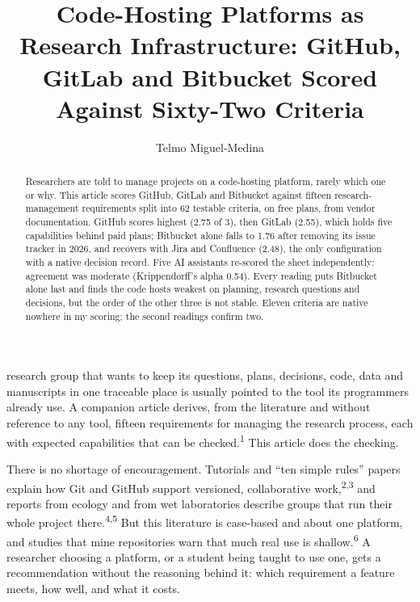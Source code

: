 \documentclass{IEEEcsmag}
\begin{document}

\title{Code-Hosting Platforms as Research Infrastructure: GitHub, GitLab and Bitbucket Scored Against Sixty-Two Criteria}

\author{Telmo Miguel-Medina}


\begin{abstract}
Researchers are told to manage projects on a code-hosting platform, rarely which one or why. This article scores GitHub, GitLab and Bitbucket against fifteen research-management requirements split into 62 testable criteria, on free plans, from vendor documentation. GitHub scores highest (2.75 of 3), then GitLab (2.55), which holds five capabilities behind paid plans; Bitbucket alone falls to 1.76 after removing its issue tracker in 2026, and recovers with Jira and Confluence (2.48), the only configuration with a native decision record. Five AI assistants re-scored the sheet independently: agreement was moderate (Krippendorff's alpha 0.54). Every reading puts Bitbucket alone last and finds the code hosts weakest on planning, research questions and decisions, but the order of the other three is not stable. Eleven criteria are native nowhere in my scoring; the second readings confirm two.
\end{abstract}

\maketitle

 research group that wants to keep its questions, plans, decisions, code, data and manuscripts in one traceable place is usually pointed to the tool its programmers already use. A companion article derives, from the literature and without reference to any tool, fifteen requirements for managing the research process, each with expected capabilities that can be checked.\textsuperscript{1} This article does the checking.

There is no shortage of encouragement. Tutorials and ``ten simple rules'' papers explain how Git and GitHub support versioned, collaborative work,\textsuperscript{2,3} and reports from ecology and from wet laboratories describe groups that run their whole project there.\textsuperscript{4,5} But this literature is case-based and about one platform, and studies that mine repositories warn that much real use is shallow.\textsuperscript{6} A researcher choosing a platform, or a student being taught to use one, gets a recommendation without the reasoning behind it: which requirement a feature meets, how well, and what it costs.
\end{document}
